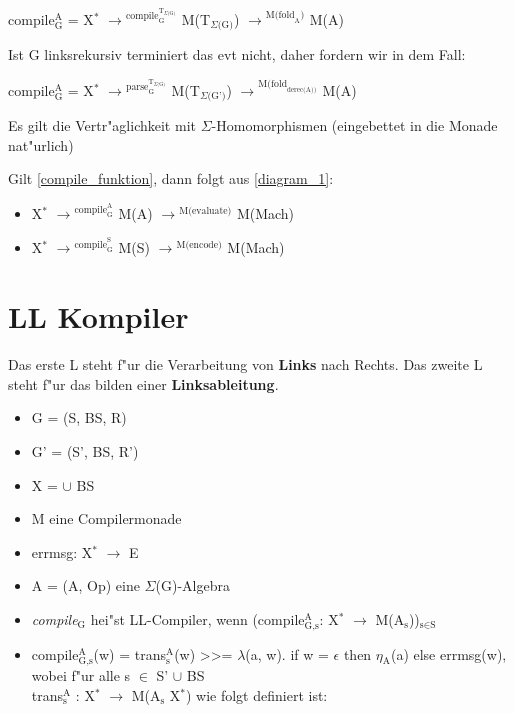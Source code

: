 \documentclass[11pt]{article}
\begin{document}
\label{compile_funktion}
\begin{center}
compile$_{\text{G}}^{\text{A}}$ = X$^{\text{*}}$ $\to$$^{\text{compile}_{\text{G}}^{\text{T}_{\Sigma\text{(G)}}}}$ M(T$_{\Sigma\text{(G)}}$) $\to$$^{\text{M(fold}_{\text{A}}\text{)}}$ M(A)
\end{center}

Ist G linksrekursiv terminiert das evt nicht, daher fordern wir in dem Fall:

\begin{center}
compile$_{\text{G}}^{\text{A}}$ = X$^{\text{*}}$ $\to$$^{\text{parse}_{\text{G}}^{\text{T}_{\Sigma\text{(G)}}}}$ M(T$_{\Sigma\text{(G')}}$) $\to$$^{\text{M(fold}_{\text{derec(A))}}}$ M(A)
\end{center}

Es gilt die Vertr"aglichkeit mit $\Sigma$-Homomorphismen (eingebettet in die Monade nat"urlich)

Gilt \ref{compile_funktion}, dann folgt aus \ref{diagram_1}: 
\begin{itemize}
\item X$^{\text{*}}$ $\to$$^{\text{compile}_{\text{G}}^{\text{A}}}$ M(A) $\to$$^{\text{M(evaluate)}}$ M(Mach) \\
\item X$^{\text{*}}$ $\to$$^{\text{compile}_{\text{G}}^{\text{S}}}$ M(S) $\to$$^{\text{M(encode)}}$ M(Mach)
\end{itemize}


\section{LL Kompiler}
\label{sec-6}

Das erste L steht f"ur die Verarbeitung von \textbf{Links} nach Rechts. Das zweite L steht f"ur das bilden einer \textbf{Linksableitung}.

\begin{itemize}
\item G = (S, BS, R)
\item G' = (S', BS, R')
\item X = $\cup$ BS
\item M eine Compilermonade
\item errmsg: X$^{\text{*}}$ $\to$ E
\item A = (A, Op) eine $\Sigma$(G)-Algebra
\item \emph{compile$_{\text{G}}$} hei"st LL-Compiler, wenn (compile$^{\text{A}}_{\text{G,s}}$: X$^{\text{*}}$ $\to$ M(A$_{\text{s}}$))$_{\text{s} \in \text{S}}$
\item compile$_{\text{G,s}}^{\text{A}}$(w) = trans$_{\text{s}}^{\text{A}}$(w) >>= $\lambda$(a, w). if w = $\epsilon$ then $\eta$$_{\text{A}}$(a) else errmsg(w), wobei f"ur alle s $\in$ S' $\cup$ BS \\ trans$_{\text{s}}^{\text{A}}$ : X$^{\text{*}}$ $\to$ M(A$_{\text{s}}$ \texttimes{} X$^{\text{*}}$) wie folgt definiert ist:
\end{itemize}
\end{document}
